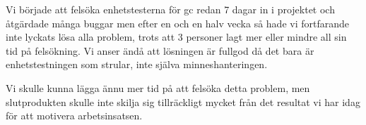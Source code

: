 Vi började att felsöka enhetstesterna för gc redan 7 dagar in i projektet och åtgärdade många buggar men efter en och en halv vecka så hade vi fortfarande inte lyckats lösa alla problem, trots att 3 personer lagt mer eller mindre all sin tid på felsökning. Vi anser ändå att lösningen är fullgod då det bara är enhetstestningen som strular, inte själva minneshanteringen.

Vi skulle kunna lägga ännu mer tid på att felsöka detta problem, men slutprodukten skulle inte skilja sig tillräckligt mycket från det resultat vi har idag för att motivera arbetsinsatsen.
